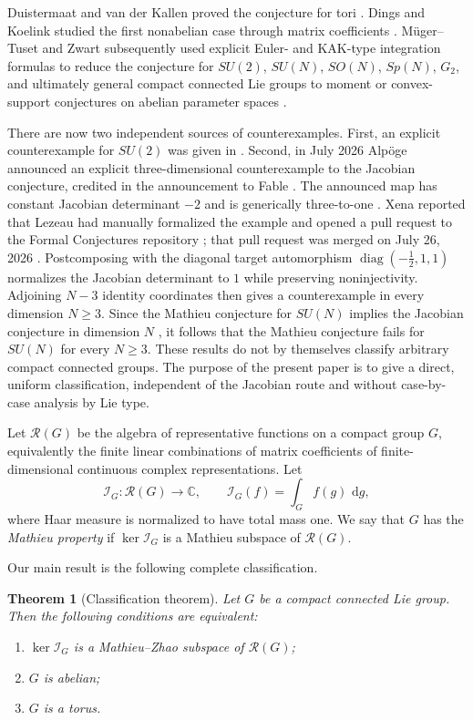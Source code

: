 \documentclass[11pt]{article}
\numberwithin{equation}{section}
\newtheorem{theorem}{Theorem}[section]
\newcommand{\C}{\mathbb C}
\newcommand{\cR}{\mathcal R}
\newcommand{\cI}{\mathcal I}
\newcommand{\dd}{\,\mathrm d}
\begin{document}
Duistermaat and van der Kallen proved the conjecture for tori
\cite{DuistermaatVanderKallen1998}.  Dings and Koelink studied the first
nonabelian case through matrix coefficients \cite{DingsKoelink2015}.
M\"uger--Tuset and Zwart subsequently used explicit Euler- and KAK-type
integration formulas to reduce the conjecture for $SU(2)$, $SU(N)$, $SO(N)$,
$Sp(N)$, $G_2$, and ultimately general compact connected Lie groups to moment
or convex-support conjectures on abelian parameter spaces
\cite{MugerTuset2024,MugerTuset2025,Zwart2023,Zwart2024,Zwart2025}.

There are now two independent sources of counterexamples.  First, an explicit
counterexample for $SU(2)$ was given in \cite{Long2026}.  Second, in July 2026
Alp\"oge announced an explicit three-dimensional counterexample to the
Jacobian conjecture, credited in the announcement to Fable
\cite{Alpoge2026}.  The announced map has constant Jacobian determinant $-2$
and is generically three-to-one \cite{SecretBloggingSeminar2026}.  Xena
reported that Lezeau had manually formalized the example and opened a pull
request to the Formal Conjectures repository \cite{Xena2026}; that pull
request was merged on July 26, 2026 \cite{Lezeau2026}.  Postcomposing with the
diagonal target automorphism $\operatorname{diag}(-\tfrac12,1,1)$ normalizes
the Jacobian determinant to $1$ while preserving noninjectivity.  Adjoining
$N-3$ identity coordinates then gives a counterexample in every dimension
$N\geq3$.  Since the Mathieu conjecture for $SU(N)$ implies the Jacobian
conjecture in dimension $N$ \cite{Mathieu1997,ZwartMathieu2026}, it follows
that the Mathieu conjecture fails for $SU(N)$ for every $N\geq3$.  These
results do not by themselves classify arbitrary compact connected groups.
The purpose of the present paper is to give a direct, uniform classification,
independent of the Jacobian route and without case-by-case analysis by Lie
type.

Let $\cR(G)$ be the algebra of representative functions on a compact group
$G$, equivalently the finite linear combinations of matrix coefficients of
finite-dimensional continuous complex representations.  Let
\[
 \cI_G:\cR(G)\longrightarrow\C,
 \qquad
 \cI_G(f)=\int_G f(g)\,\dd g,
\]
where Haar measure is normalized to have total mass one.  We say that $G$ has
the \emph{Mathieu property} if $\ker\cI_G$ is a Mathieu subspace of
$\cR(G)$.

Our main result is the following complete classification.

\begin{theorem}[Classification theorem]\label{thm:classification}
Let $G$ be a compact connected Lie group.  Then the following conditions are
equivalent:
\begin{enumerate}[label=\textup{(\roman*)}]
\item $\ker\cI_G$ is a Mathieu--Zhao subspace of $\cR(G)$;
\item $G$ is abelian;
\item $G$ is a torus.
\end{enumerate}
\end{theorem}
\end{document}
